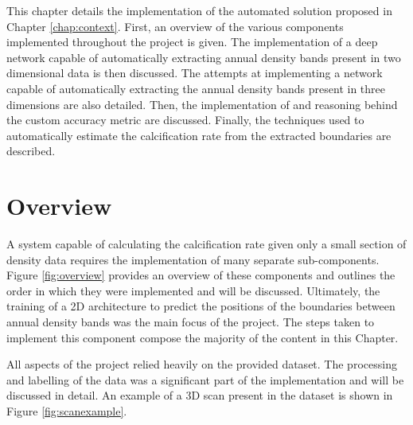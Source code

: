 This chapter details the implementation of the automated solution proposed in Chapter \ref{chap:context}. First, an overview of the various components implemented throughout the project is given. The implementation of a deep network capable of automatically extracting annual density bands present in two dimensional data is then discussed. The attempts at implementing a network capable of automatically extracting the annual density bands present in three dimensions are also detailed. Then, the implementation of and reasoning behind the custom accuracy metric are discussed. Finally, the techniques used to automatically estimate the calcification rate from the extracted boundaries are described.

\section{Overview}

A system capable of calculating the calcification rate given only a small section of density data requires the implementation of many separate sub-components. Figure \ref{fig:overview} provides an overview of these components and outlines the order in which they were implemented and will be discussed. Ultimately, the training of a 2D architecture to predict the positions of the boundaries between annual density bands was the main focus of the project. The steps taken to implement this component compose the majority of the content in this Chapter.

All aspects of the project relied heavily on the provided dataset. The processing and labelling of the data was a significant part of the implementation and will be discussed in detail. An example of a 3D scan present in the dataset is shown in Figure \ref{fig:scanexample}.


